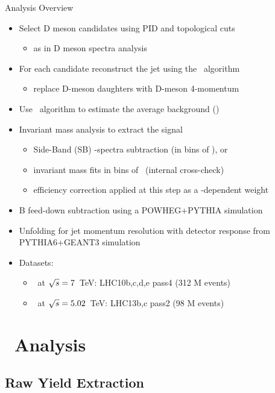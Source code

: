 \documentclass[xcolor={usenames,dvipsnames}]{beamer}
\begin{document}
\begin{frame}{Analysis Overview}
\begin{itemize}
\item \alert{Select D meson candidates using PID and topological cuts}
\begin{itemize}
\item as in D meson spectra analysis
\end{itemize}
\item \alert{For each candidate reconstruct the jet using the \antikt\ algorithm}
\begin{itemize}
\item replace D-meson daughters with D-meson 4-momentum
\end{itemize}
\item Use \kt\ algorithm to estimate the average background (\pPb)
\item Invariant mass analysis to extract the signal
\begin{itemize}
\item \alert{Side-Band (SB) \ptjet-spectra subtraction (in bins of \ptd)}, or
\item invariant mass fits in bins of \ptjet\ (internal cross-check)
\item efficiency correction applied at this step as a \ptd-dependent weight
\end{itemize}
\item \alert{B feed-down subtraction} using a POWHEG+PYTHIA simulation
\item \alert{Unfolding for jet momentum resolution} with detector response from PYTHIA6+GEANT3 simulation
\item Datasets:
\begin{itemize}
\item \pp\ at $\sqrt{s}=7$~TeV: LHC10b,c,d,e pass4 (312 M events)
\item \pPb\ at $\sqrt{s}=5.02$~TeV: LHC13b,c pass2 (98 M events)
\end{itemize}
\end{itemize}
\end{frame}

\section{\pp\ Analysis}

\subsection{Raw Yield Extraction}
\end{document}

